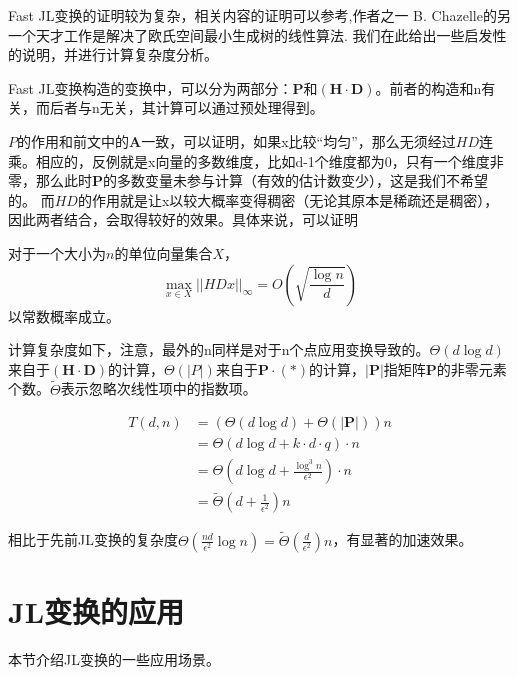 \documentclass[lang=cn,newtx,10pt,scheme=chinese,chinesefont=nofont,citestyle=gb7714-2015, bibstyle=gb7714-2015]{elegantbook}
\begin{document}
\begin{refsection}
Fast JL变换的证明较为复杂，相关内容的证明可以参考\cite{Ailon2006ApproximateNN},作者之一 B. Chazelle的另一个天才工作是解决了欧氏空间最小生成树的线性算法\cite{chazelle2000minimum}.
我们在此给出一些启发性的说明，并进行计算复杂度分析。

Fast JL变换构造的变换中，可以分为两部分：$\mathbf{P}$和$\mathbf{(\mathbf{H}\cdot\mathbf{D})}$。前者的构造和n有关，而后者与n无关，其计算可以通过预处理得到。

$P$的作用和前文中的$\mathbf{A}$一致，可以证明，如果x比较“均匀”，那么无须经过$HD$连乘。相应的，反例就是x向量的多数维度，比如d-1个维度都为0，只有一个维度非零，那么此时$\mathbf{P}$的多数变量未参与计算（有效的估计数变少），这是我们不希望的。
而$HD$的作用就是让x以较大概率变得稠密（无论其原本是稀疏还是稠密），因此两者结合，会取得较好的效果。具体来说，可以证明
\begin{theorem}
    对于一个大小为$n$的单位向量集合$X$，$$\max_{x\in X}||HDx||_\infty=O(\sqrt{\frac{\log n}{d}})$$以常数概率成立。
\end{theorem}


计算复杂度如下，注意，最外的n同样是对于n个点应用变换导致的。$\Theta(d\log d)$来自于$\mathbf{(\mathbf{H}\cdot\mathbf{D})}$的计算，$\Theta(|P|)$来自于$\mathbf{P}\cdot (*)$的计算，$|\mathbf{P}|$指矩阵$\mathbf{P}$的非零元素个数。$\widetilde{\Theta}$表示忽略次线性项中的指数项。


\begin{align*}
    T(d,n) &= (\Theta(d\log d)+\Theta(|\mathbf{P}|))n\\
    &=\Theta(d\log d + k\cdot d \cdot q)\cdot n\\
    &=\Theta(d\log d + \frac{\log^3n}{\epsilon^2})\cdot n\\
    &=\widetilde{\Theta}(d+\frac{1}{\epsilon^2})n
\end{align*}

相比于先前JL变换的复杂度$\Theta(\frac{nd}{\epsilon^2}\log n)=\widetilde{\Theta}(\frac{d}{\epsilon^2})n$，有显著的加速效果。
\section{JL变换的应用}
本节介绍JL变换的一些应用场景。




\end{refsection}
\end{document}
